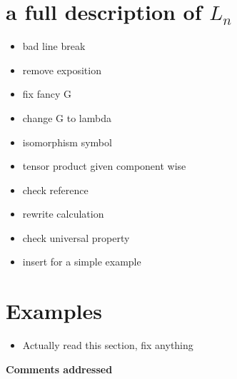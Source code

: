\documentclass{amsart}
\begin{document}
\section{a full description of $L_n $}

\begin{itemize}
\item bad line break
\item remove exposition
\item fix fancy G
\item change G to lambda
\item isomorphism symbol
\item tensor product given component wise
\item check reference
\item rewrite calculation
\item check universal property
\item insert for a simple example
\end{itemize}



\section{ Examples}

\begin{itemize}
\item Actually read this section, fix anything
\end{itemize}
\newpage

\begin{center}
\begin{Large}
\textbf{Comments addressed}
\end{Large}
\end{center}
\vskip1cm
\end{document}
